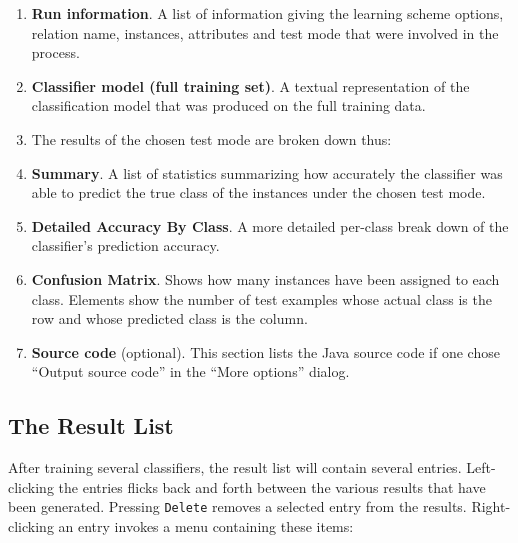 \begin{enumerate}
\item \textbf{Run information}.
A list of information giving the learning scheme options, relation name,
instances, attributes and test mode that were involved in the process.
\item \textbf{Classifier model (full training set)}.
A textual representation of the classification model that was produced on the
full training data. 
\item The results of the chosen test mode are broken down thus:
\item \textbf{Summary}.
A list of statistics summarizing how accurately the classifier was able to
predict the true class of the instances under the chosen test mode. 
\item \textbf{Detailed Accuracy By Class}.
A more detailed per-class break down of the classifier's prediction accuracy. 
\item \textbf{Confusion Matrix}.
Shows how many instances have been assigned to each class. Elements show the
number of test examples whose actual class is the row and whose predicted class
is the column.
\item \textbf{Source code} (optional).
This section lists the Java source code if one chose ``Output source code'' in 
the ``More options'' dialog.
\end{enumerate}

\subsection{The Result List}

After training several classifiers, the result list will contain several
entries.  Left-clicking the entries flicks back and forth between the various
results that have been generated. Pressing \texttt{Delete} removes a selected 
entry from the results. Right-clicking an entry invokes a menu containing these items:

